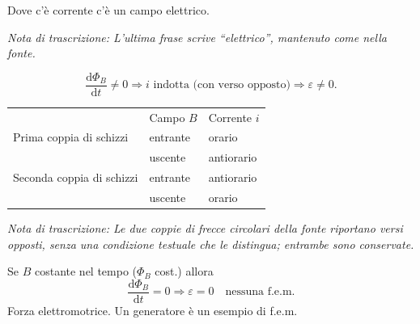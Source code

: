 \documentclass[a4paper,11pt]{article}
\newcommand{\orig}[1]{\clearpage}
\newcommand{\nota}[1]{\par\small\textit{Nota di trascrizione: #1}\par\normalsize}
\newcommand{\dd}{\mathrm{d}}
\begin{document}
Dove c'è corrente c'è un campo elettrico.
\nota{L'ultima frase scrive ``elettrico'', mantenuto come nella fonte.}
\orig{12}
\begin{center}\end{center}
\[\frac{\dd\Phi_B}{\dd t}\ne0\Rightarrow i\text{ indotta (con verso opposto)}\Rightarrow\varepsilon\ne0.\]
\begin{center}\begin{tabular}{lll}
&Campo $B$&Corrente $i$\\
Prima coppia di schizzi&entrante&orario\\
&uscente&antiorario\\
Seconda coppia di schizzi&entrante&antiorario\\
&uscente&orario
\end{tabular}\end{center}
\begin{center}\end{center}
\nota{Le due coppie di frecce circolari della fonte riportano versi opposti, senza una condizione testuale che le distingua; entrambe sono conservate.}
Se $B$ costante nel tempo ($\Phi_B$ cost.) allora
\[\frac{\dd\Phi_B}{\dd t}=0\Rightarrow\varepsilon=0\quad\text{nessuna f.e.m.}\]
Forza elettromotrice. Un generatore è un esempio di f.e.m.
\end{document}
